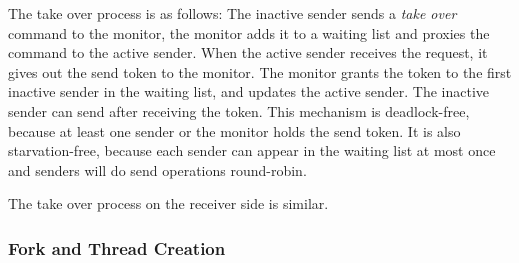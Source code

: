The take over process is as follows:
The inactive sender sends a \emph{take over} command to the monitor, the monitor adds it to a waiting list and proxies the command to the active sender.
When the active sender receives the request, it gives out the send token to the monitor.
The monitor grants the token to the first inactive sender in the waiting list, and updates the active sender.
The inactive sender can send after receiving the token.
This mechanism is deadlock-free, because at least one sender or the monitor holds the send token.
It is also starvation-free, because each sender can appear in the waiting list at most once and senders will do send operations round-robin.

The take over process on the receiver side is similar.




\subsubsection{Fork and Thread Creation}
\label{subsubsec:fork_fork}
\quad

